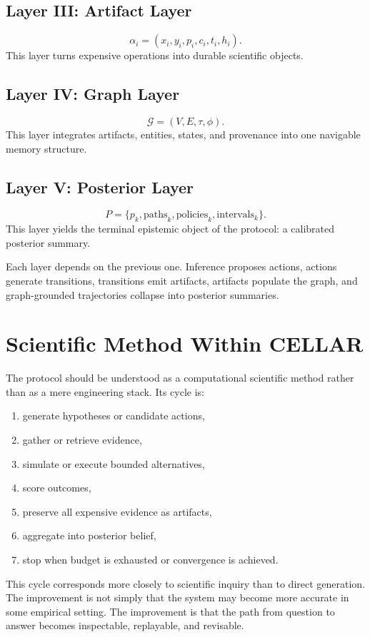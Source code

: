 \documentclass[11pt]{article}
\theoremstyle{definition}
\newcommand{\graph}{\mathcal{G}}
\begin{document}
\subsection{Layer III: Artifact Layer}
\[
\alpha_i=(x_i,y_i,p_i,c_i,t_i,h_i).
\]
This layer turns expensive operations into durable scientific objects.

\subsection{Layer IV: Graph Layer}
\[
\graph=(V,E,\tau,\phi).
\]
This layer integrates artifacts, entities, states, and provenance into one navigable memory structure.

\subsection{Layer V: Posterior Layer}
\[
P=\{p_k,\mathrm{paths}_k,\mathrm{policies}_k,\mathrm{intervals}_k\}.
\]
This layer yields the terminal epistemic object of the protocol: a calibrated posterior summary.

Each layer depends on the previous one. Inference proposes actions, actions generate transitions, transitions emit artifacts, artifacts populate the graph, and graph-grounded trajectories collapse into posterior summaries.

\section{Scientific Method Within CELLAR}

The protocol should be understood as a computational scientific method rather than as a mere engineering stack. Its cycle is:

\begin{enumerate}[leftmargin=1.5em]
    \item generate hypotheses or candidate actions,
    \item gather or retrieve evidence,
    \item simulate or execute bounded alternatives,
    \item score outcomes,
    \item preserve all expensive evidence as artifacts,
    \item aggregate into posterior belief,
    \item stop when budget is exhausted or convergence is achieved.
\end{enumerate}

This cycle corresponds more closely to scientific inquiry than to direct generation. The improvement is not simply that the system may become more accurate in some empirical setting. The improvement is that the path from question to answer becomes inspectable, replayable, and revisable.
\end{document}
